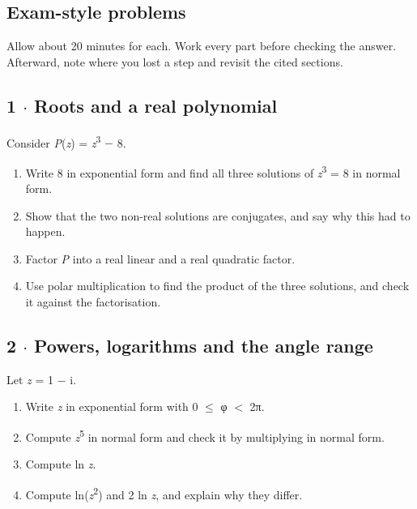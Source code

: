 \documentclass[11pt]{article}
\begin{document}
\begin{keepsection}
\section{Exam-style problems}

Allow about 20 minutes for each. Work every part before checking the answer. Afterward, note where you lost a step and revisit the cited sections.

\begin{keepsection}
\subsection{1 \ensuremath{\cdot} Roots and a real polynomial}

Consider \textit{P}(\textit{z}) = \textit{z}\textsuperscript{3} \ensuremath{-} 8.

\begin{enumerate}
\item Write 8 in exponential form and find all three solutions of \textit{z}\textsuperscript{3} = 8 in normal form.
\item Show that the two non-real solutions are conjugates, and say why this had to happen.
\item Factor \textit{P} into a real linear and a real quadratic factor.
\item Use polar multiplication to find the product of the three solutions, and check it against the factorisation.
\end{enumerate}

\end{keepsection}

\begin{keepsection}
\subsection{2 \ensuremath{\cdot} Powers, logarithms and the angle range}

Let \textit{z} = 1 \ensuremath{-} i.

\begin{enumerate}
\item Write \textit{z} in exponential form with 0 \ensuremath{\leq} φ \ensuremath{<} 2π.
\item Compute \textit{z}\textsuperscript{5} in normal form and check it by multiplying in normal form.
\item Compute ln \textit{z}.
\item Compute ln(\textit{z}\textsuperscript{2}) and 2 ln \textit{z}, and explain why they differ.
\end{enumerate}

\end{keepsection}
\end{keepsection}
\end{document}
